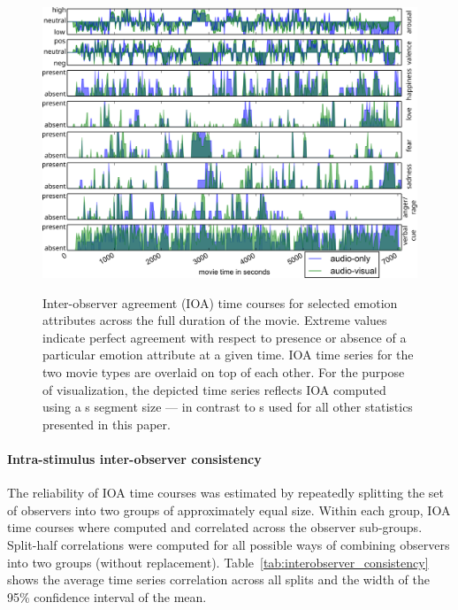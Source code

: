\documentclass[10pt,a4paper,twocolumn]{article}
\begin{document}
\begin{figure}
  \centering
  \includegraphics[width=\linewidth]{figures/indicator_ts_allchar}\\
  \caption{Inter-observer agreement (IOA) time courses for selected emotion
    attributes across the full duration of the movie. Extreme values indicate
    perfect agreement with respect to presence or absence of a particular emotion
    attribute at a given time. IOA time series for the two movie types are
    overlaid on top of each other.
    For the purpose of
    visualization, the depicted time series reflects IOA computed using a
    \unit[10]{s} segment size --- in contrast to \unit[1]{s} used for all other
  statistics presented in this paper.}
  \label{fig:indicatortsallchar}
\end{figure}


\paragraph{Intra-stimulus inter-observer consistency}

The reliability of IOA time courses was estimated by repeatedly splitting the
set of observers into two groups of approximately equal size. Within each
group, IOA time courses where computed and correlated across the observer
sub-groups. Split-half correlations were computed for all possible ways of
combining observers into two groups (without replacement).
Table~\ref{tab:interobserver_consistency} shows the average time series
correlation across all splits and the width of the 95\% confidence interval of
the mean.
\end{document}
